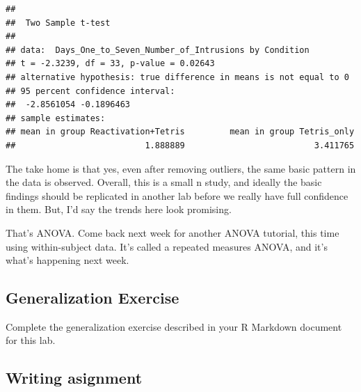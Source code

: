 \documentclass[]{book}
\newenvironment{Shaded}{\begin{snugshade}}{\end{snugshade}}
\newcommand{\KeywordTok}[1]{\textcolor[rgb]{0.13,0.29,0.53}{\textbf{{#1}}}}
\newcommand{\DataTypeTok}[1]{\textcolor[rgb]{0.13,0.29,0.53}{{#1}}}
\newcommand{\StringTok}[1]{\textcolor[rgb]{0.31,0.60,0.02}{{#1}}}
\newcommand{\OtherTok}[1]{\textcolor[rgb]{0.56,0.35,0.01}{{#1}}}
\newcommand{\NormalTok}[1]{{#1}}
\theoremstyle{definition}
\theoremstyle{definition}
\theoremstyle{definition}
\theoremstyle{remark}
\begin{document}
\begin{Shaded}
\end{Shaded}

\begin{verbatim}
## 
##  Two Sample t-test
## 
## data:  Days_One_to_Seven_Number_of_Intrusions by Condition
## t = -2.3239, df = 33, p-value = 0.02643
## alternative hypothesis: true difference in means is not equal to 0
## 95 percent confidence interval:
##  -2.8561054 -0.1896463
## sample estimates:
## mean in group Reactivation+Tetris         mean in group Tetris_only 
##                          1.888889                          3.411765
\end{verbatim}

The take home is that yes, even after removing outliers, the same basic
pattern in the data is observed. Overall, this is a small n study, and
ideally the basic findings should be replicated in another lab before we
really have full confidence in them. But, I'd say the trends here look
promising.

That's ANOVA. Come back next week for another ANOVA tutorial, this time
using within-subject data. It's called a repeated measures ANOVA, and
it's what's happening next week.

\subsection{Generalization Exercise}\label{generalization-exercise-5}

Complete the generalization exercise described in your R Markdown
document for this lab.

\subsection{Writing asignment}\label{writing-asignment-5}
\end{document}
